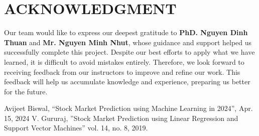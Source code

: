 \documentclass{ieeeojies}
\begin{document}
 \section{ACKNOWLEDGMENT}
   Our team would like to express our deepest gratitude to \textbf{PhD. Nguyen Dinh Thuan}  and \textbf{Mr. Nguyen Minh Nhut}, whose guidance and support helped us successfully complete this project. Despite our best efforts to apply what we have learned, it is difficult to avoid mistakes entirely. Therefore, we look forward to receiving feedback from our instructors to improve and refine our work. This feedback will help us accumulate knowledge and experience, preparing us better for the future.
\begin{thebibliography}{00}
 Avijeet Biswal, “Stock Market Prediction using Machine Learning in 2024”, Apr. 15, 2024
 V. Gururaj, ”Stock Market Prediction using Linear Regression and Support Vector Machines” vol. 14, no. 8, 2019.


\end{thebibliography}
\end{document}
